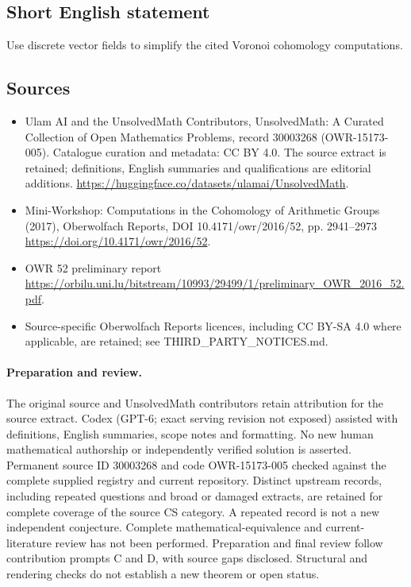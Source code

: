 \documentclass[11pt]{article}
\begin{document}
\subsection{Short English statement}
Use discrete vector fields to simplify the cited Voronoi cohomology computations.
\subsection{Sources}
\begin{itemize}
\item[\hypertarget{source:30003268:1}{S1}] Ulam AI and the UnsolvedMath Contributors, UnsolvedMath: A Curated Collection of Open Mathematics Problems, record 30003268 (OWR-15173-005). Catalogue curation and metadata: CC BY 4.0. The source extract is retained; definitions, English summaries and qualifications are editorial additions.
\url{https://huggingface.co/datasets/ulamai/UnsolvedMath}.
\item[\hypertarget{source:30003268:2}{S2}] Mini-Workshop: Computations in the Cohomology of Arithmetic Groups (2017), Oberwolfach Reports, DOI 10.4171/owr/2016/52, pp. 2941--2973
\url{https://doi.org/10.4171/owr/2016/52}.
\item[\hypertarget{source:30003268:3}{S3}] OWR 52 preliminary report
\url{https://orbilu.uni.lu/bitstream/10993/29499/1/preliminary_OWR_2016_52.pdf}.
\item Source-specific Oberwolfach Reports licences, including CC BY-SA 4.0 where applicable, are retained; see THIRD\_PARTY\_NOTICES.md.
\end{itemize}
\paragraph{Preparation and review.}
The original source and UnsolvedMath contributors retain attribution for the source extract. Codex (GPT-6; exact serving revision not exposed) assisted with definitions, English summaries, scope notes and formatting. No new human mathematical authorship or independently verified solution is asserted. Permanent source ID 30003268 and code OWR-15173-005 checked against the complete supplied registry and current repository. Distinct upstream records, including repeated questions and broad or damaged extracts, are retained for complete coverage of the source CS category. A repeated record is not a new independent conjecture. Complete mathematical-equivalence and current-literature review has not been performed. Preparation and final review follow contribution prompts C and D, with source gaps disclosed. Structural and rendering checks do not establish a new theorem or open status.
\label{end:30003268}
\end{document}
